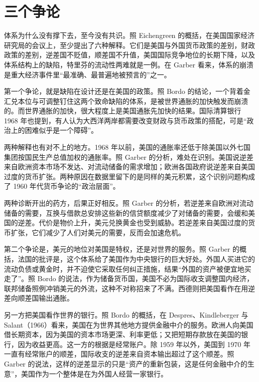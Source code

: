 \section{三个争论}\label{sec:brettonwoods-debate}

体系为什么没有撑下去，至今没有共识。照 Eichengreen 的概括，在美国国家经济研究局的会议上，至少提出了六种解释\cite{eichengreen1993}。它们是美国与外国货币政策的差别，财政政策的差别，逆差国不贬值，顺差国不升值，美国国际竞争地位的长期下降，以及体系结构上的缺陷，特里芬的流动性两难就是一例\cite{eichengreen1993}。在 Garber 看来，体系的崩溃是重大经济事件里“最准确、最普遍地被预言的”之一\cite{garber1993}。

第一个争论，就是缺陷在设计还是在美国的政策。照 Bordo 的结论，一个背着金汇兑本位与可调整钉住这两个致命缺陷的体系，是被世界通胀的加快触发而崩溃的\cite{bordo1993}。而世界通胀的加快，很大程度上是美国通胀先加快的结果\cite{bordo1993}。国际清算银行 1968 年也提到，有人认为大西洋两岸都需要改变财政与货币政策的搭配，可是“政治上的困难似乎是一个障碍”\cite{bis36}。

两种解释也有对不上的地方。1968 年以前，美国的通胀率还低于除美国以外七国集团按国民生产总值加权的通胀率\cite{bordo1993}。照 Garber 的分析，难处在识别。美国说逆差来自欧洲资本市场不发达、对流动储备的需求增加；欧洲各国政府说逆差来自美国过度的货币扩张\cite{garber1993}。两种原因在数据里留下的是同样的美元积累，这个识别问题构成了 1960 年代货币争论的“政治层面”\cite{garber1993}。

两种诊断开出的药方，后果正好相反。照 Garber 的分析，若逆差来自欧洲对流动储备的需要，互换与借款总安排这些新的信贷额度减少了对储备的需要，会缓和美国的逆差\cite{garber1993}。代价是物价上升，美元兑换黄金也受到威胁\cite{garber1993}。若逆差来自美国过度的货币扩张，它们减少了人们对美元的需要，反而会加速危机\cite{garber1993}。

第二个争论是，美元的地位对美国是特权，还是对世界的服务。照 Garber 的概括，法国的批评是，这个体系给了美国作为中央银行的巨大好处\cite{garber1993}。外国人买进它的流动负债或黄金时，并不迫使它采取任何纠正措施，结果“外国的资产被便宜地买走了”\cite{garber1993}。照 Bordo 的说法，作为储备货币国，美国不必为国际收支调整国内经济，联邦储备照例冲销美元的外流，这种不对称招来了不满\cite{bordo1993}。西德则把美国看作在用逆差向顺差国输出通胀\cite{bordo1993}。

另一方把美国看作世界的银行。照 Bordo 的概括，在 Despres、Kindleberger 与 Salant（1966）看来，美国在为世界其他地方提供金融中介的服务\cite{bordo1993}。欧洲人向美国借长期资本，因为美国的资本市场更深、利率更低；又把短期存款放在美国的银行，因为收益更高\cite{bordo1993}。这一方的根据是经常账户。除 1959 年以外，美国到 1970 年一直有经常账户的顺差，国际收支的逆差来自资本输出超过了这个顺差\cite{bordo1993}。照 Garber 的说法，这样的逆差显示的只是“资产的重新包装，这是任何金融中介的生意”，美国作为一个整体是在为外国人经营一家银行\cite{garber1993}。

